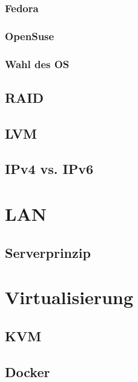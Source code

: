 \subsubsection{Fedora}

\subsubsection{OpenSuse}

\subsubsection{Wahl des OS}

\subsection{RAID}

\subsection{LVM}

\subsection{IPv4 vs. IPv6}

\section{LAN}
\subsection{Serverprinzip}

\section{Virtualisierung}
\subsection{KVM}

\subsection{Docker}

